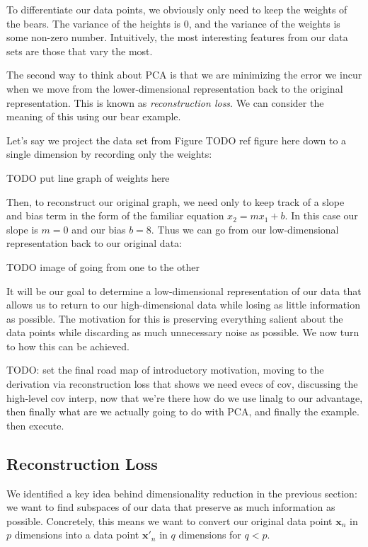 To differentiate our data points, we obviously only need to keep the weights of the bears. The variance of the heights is 0, and the variance of the weights is some non-zero number. Intuitively, the most interesting features from our data sets are those that vary the most.


The second way to think about PCA is that we are minimizing the error we incur when we move from the lower-dimensional representation back to the original representation. This is known as \textit{reconstruction loss}. We can consider the meaning of this using our bear example.

Let's say we project the data set from Figure TODO ref figure here down to a single dimension by recording only the weights:

TODO put line graph of weights here

Then, to reconstruct our original graph, we need only to keep track of a slope and bias term in the form of the familiar equation $x_2 = mx_1 + b$. In this case our slope is $m=0$ and our bias $b=8$. Thus we can go from our low-dimensional representation back to our original data:

TODO image of going from one to the other

It will be our goal to determine a low-dimensional representation of our data that allows us to return to our high-dimensional data while losing as little information as possible. The motivation for this is preserving everything salient about the data points while discarding as much unnecessary noise as possible. We now turn to how this can be achieved.

TODO: set the final road map of introductory motivation, moving to the derivation via reconstruction loss that shows we need evecs of cov, discussing the high-level cov interp, now that we're there how do we use linalg to our advantage, then finally what are we actually going to do with PCA, and finally the example. then execute.

\subsection{Reconstruction Loss}
We identified a key idea behind dimensionality reduction in the previous section: we want to find subspaces of our data that preserve as much information as possible. Concretely, this means we want to convert our original data point $\textbf{x}_n$ in $p$ dimensions into a data point $\textbf{x}'_{n}$ in $q$ dimensions for $q < p$. 

